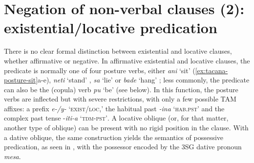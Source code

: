 \documentclass[output=paper]{langsci/langscibook}
\begin{document}
\section{Negation of non-verbal clauses (2): existential\slash locative predication}\label{sec:tacana-5}

There is no clear formal distinction between existential and locative
clauses, whether affirmative or negative. In affirmative existential and
locative clauses, the predicate is normally one of four posture verbs,
either \textit{ani} `sit' (\ref{ex:tacana-posture-sit}a-e), \textit{neti}
`stand' , \textit{sa} `lie'
 or \textit{bade} `hang'
; less commonly, the predicate can also be the
(copula) verb \textit{pu} `be' (see below). In this function, the posture
verbs are inflected but with severe restrictions, with only a few possible
TAM affixes: a prefix \textit{e-/y-} `\textsc{exist\slash loc},' the habitual
past \textit{-ina} `\textsc{hab.pst}' and the complex past tense
-\textit{iti-a} `\textsc{tdm-pst'}. A locative oblique (or, for that
matter, another type of oblique) can be present with no rigid position in
the clause. With a dative oblique, the same construction yields the
semantics of possessive predication, as seen in
, with the possessor encoded by the 3SG dative pronoun \textit{mesa}.
\end{document}
